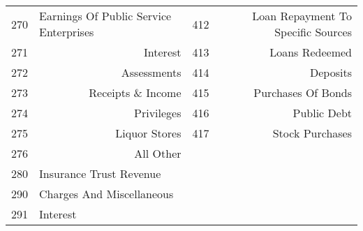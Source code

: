 \begin{tabular}{@{}rr|r|r|@{}}
\multicolumn{1}{|l|}{270}           & \multicolumn{1}{l|}{Earnings Of Public Service Enterprises}        & 412                                & Loan Repayment To Specific Sources                                                 \\
\multicolumn{1}{|r|}{271}           & Interest                                                           & 413                                & Loans Redeemed                                                                     \\
\multicolumn{1}{|r|}{272}           & Assessments                                                        & 414                                & Deposits                                                                           \\
\multicolumn{1}{|r|}{273}           & Receipts \& Income                                                 & 415                                & Purchases Of Bonds                                                                 \\
\multicolumn{1}{|r|}{274}           & Privileges                                                         & 416                                & Public Debt                                                                        \\
\multicolumn{1}{|r|}{275}           & Liquor Stores                                                      & 417                                & Stock Purchases                                                                    \\
\multicolumn{1}{|r|}{276}           & All Other                                                          & \multicolumn{1}{l|}{}              & \multicolumn{1}{l|}{}                                                              \\
\multicolumn{1}{|l|}{280}           & \multicolumn{1}{l|}{Insurance Trust Revenue}                       & \multicolumn{1}{l|}{}              & \multicolumn{1}{l|}{}                                                              \\
\multicolumn{1}{|l|}{290}           & \multicolumn{1}{l|}{Charges And Miscellaneous}                     & \multicolumn{1}{l|}{}              & \multicolumn{1}{l|}{}                                                              \\
\multicolumn{1}{|l|}{291}           & \multicolumn{1}{l|}{Interest}                                      & \multicolumn{1}{l|}{}              & \multicolumn{1}{l|}{}                                                              \\

\end{tabular}

